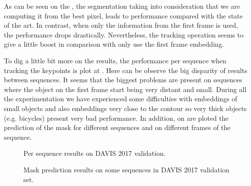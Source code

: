 As can be seen on the , the segmentation taking into consideration that we are computing it from the best pixel, leads to performance compared with the state of the art.
In contrast, when only the information from the first frame is used, the performance drops drastically.
Nevertheless, the tracking operation seems to give a little boost in comparison with only use the first frame embedding.

To dig a little bit more on the results, the performance per sequence when tracking the keypoints is plot at .
Here can be observe the big disparity of results between sequences.
It seems that the biggest problems are present on sequences where the object on the first frame start being very distant and small.
During all the experimentation we have experienced some difficulties with embeddings of small objects and also embeddings very close to the contour so very thick objects (e.g. bicycles) present very bad performance.
In addition, on  are ploted the prediction of the mask for different sequences and on different frames of the sequence.

\begin{figure}[h]
  \centering
  
  \caption{Per sequence results on DAVIS 2017 validation. }
  \label{fig:per_sequence_miou}
\end{figure}



\begin{figure}[h]
  \centering
  \caption{Mask prediction results on some sequences in DAVIS 2017 validation set. }
  \label{fig:pred_masks_davis}
\end{figure}
